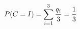 \documentclass[preview]{standalone}
\begin{document}
\begin{align*}
\special{dvisvgm:raw <g id='unique000'>}P(C=I)=\sum_{i=1}^3\frac{q_i}{3}=\frac13\special{dvisvgm:raw </g>}
\end{align*}
\end{document}
